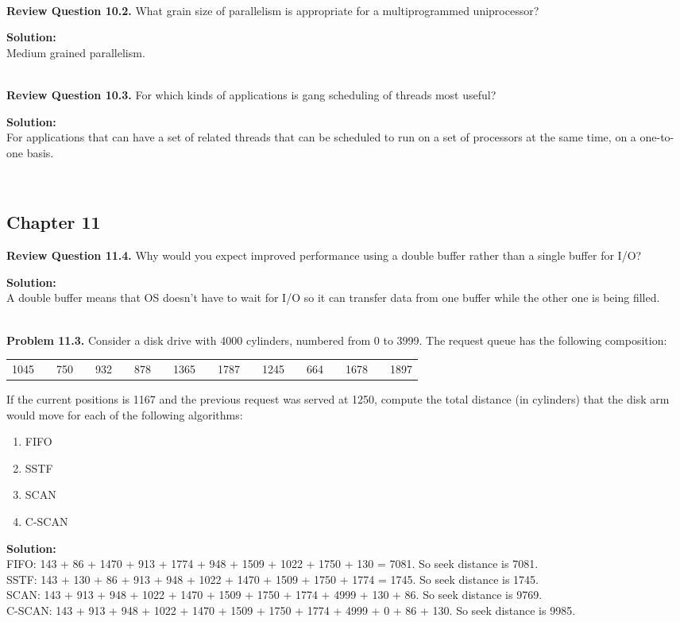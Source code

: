 \documentclass[12pt]{article}
\newcommand{\Problem}[1]{%
	\textbf{Problem #1.}%
}
\newcommand{\Review}[1]{%
	\textbf{Review Question #1.}%
}
\newcommand\Solution{%
	\noindent \textbf{Solution:}\\%
}
\begin{document}
~\\
\Review{10.2} What grain size of parallelism is appropriate for a multiprogrammed uniprocessor?

\Solution Medium grained parallelism. 

~\\
\Review{10.3} For which kinds of applications is gang scheduling of threads most useful?

\Solution For applications that can have a set of related threads that can be scheduled to run on a set of processors at the same time, on a one-to-one basis.

~\\
\subsection*{Chapter 11}

\Review{11.4} Why would you expect improved performance using a double buffer rather than a single buffer for I/O?

\Solution A double buffer means that OS doesn't have to wait for I/O so it can transfer data from one buffer while the other one is being filled.

~\\
\Problem{11.3} Consider a disk drive with 4000 cylinders, numbered from 0 to 3999. The request queue has the following composition:
	\begin{table}[H]
		\centering
		\begin{tabular}{llcllllllllllllllll}
			1045 &  & 750 &  & 932 &  & 878 &  & 1365 &  & 1787 &  & 1245 &  & 664 &  & 1678 &  & 1897
		\end{tabular}
	\end{table}
	If the current positions is 1167 and the previous request was served at 1250, compute the total distance (in cylinders) that the disk arm would move for each of the following algorithms:
	\begin{enumerate}[label=\alph*:]
		\item FIFO
		\item SSTF
		\item SCAN
		\item C-SCAN
	\end{enumerate}

\Solution 	 FIFO: 143 + 86 + 1470 + 913 + 1774 + 948 + 1509 + 1022 + 1750 + 130 = 7081. So seek distance is 7081.\\
		 SSTF: 143 + 130 + 86 + 913 + 948 + 1022 + 1470 + 1509 + 1750 + 1774 = 1745. So seek distance is 1745.\\
		 SCAN: 143 + 913 + 948 + 1022 + 1470 + 1509 + 1750 + 1774 + 4999 + 130 + 86. So seek distance is 9769.\\
		 C-SCAN: 143 + 913 + 948 + 1022 + 1470 + 1509 + 1750 + 1774 + 4999 + 0 + 86 + 130. So seek distance is 9985.\\
\end{document}
